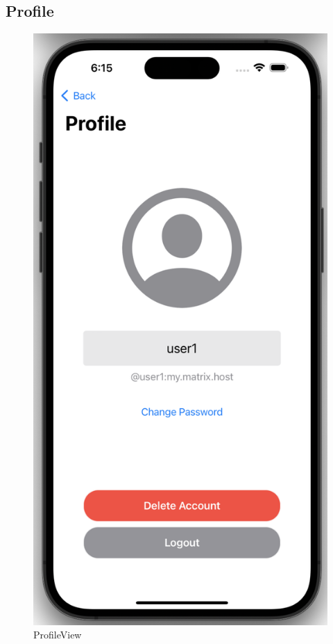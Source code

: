     \newpage
    \subsection{Profile}

    \begin{figure}[h]
        \includegraphics[scale=0.5]{profile}
        \centering
        \caption{ProfileView}\label{fig:profileview}
    \end{figure}

